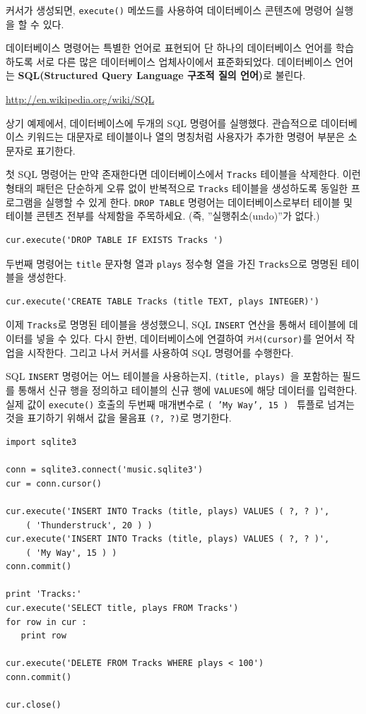 커서가 생성되면, {\tt execute()} 메쏘드를 사용하여 데이터베이스 콘텐츠에 명령어 실행을 할 수 있다.

데이터베이스 명령어는 특별한 언어로 표현되어 단 하나의 데이터베이스 언어를 학습하도록 서로 다른 많은 데이터베이스 업체사이에서 표준화되었다.
데이터베이스 언어는 {\bf SQL(Structured Query Language 구조적 질의 언어)}로 불린다.

\url{http://en.wikipedia.org/wiki/SQL}

상기 예제에서, 데이터베이스에 두개의 SQL 명령어를 실행했다. 관습적으로 데이터베이스 키워드는 대문자로 테이블이나 열의 명칭처럼 사용자가 추가한
명령어 부분은 소문자로 표기한다.

첫 SQL 명령어는 만약 존재한다면 데이터베이스에서 {\tt Tracks} 테이블을 삭제한다.
이런 형태의 패턴은 단순하게 오류 없이 반복적으로 {\tt Tracks} 테이블을 생성하도록 동일한 프로그램을 실행할 수 있게 한다.
{\tt DROP TABLE} 명령어는 데이터베이스로부터 테이블 및 테이블 콘텐츠 전부를 삭제함을 주목하세요. (즉, ''실행취소(undo)''가 없다.)

\beforeverb
\begin{verbatim}
cur.execute('DROP TABLE IF EXISTS Tracks ')
\end{verbatim}
\afterverb
%

두번째 명령어는 {\tt title} 문자형 열과 {\tt plays} 정수형 열을 가진 {\tt Tracks}으로 명명된 테이블을 생성한다.

\beforeverb
\begin{verbatim}
cur.execute('CREATE TABLE Tracks (title TEXT, plays INTEGER)')
\end{verbatim}
\afterverb
%

이제 {\tt Tracks}로 명명된 테이블을 생성했으니, SQL {\tt INSERT} 연산을 통해서 테이블에 데이터를 넣을 수 있다.
다시 한번, 데이터베이스에 연결하여 {\tt 커서(cursor)}를 얻어서 작업을 시작한다. 그리고 나서 커서를 사용하여 SQL 명령어를 수행한다.

SQL {\tt INSERT} 명령어는 어느 테이블을 사용하는지, {\tt (title, plays) }을 포함하는 필드를 통해서 신규 행을 정의하고 
테이블의 신규 행에 {\tt VALUES}에 해당 데이터를 입력한다.
실제 값이 {\tt execute()} 호출의 두번째 매개변수로 {\tt ( 'My Way', 15 ) } 튜플로 넘겨는 것을 표기하기 위해서 값을 물음표 {\tt (?, ?)}로 명기한다.

\beforeverb
\begin{verbatim}
import sqlite3

conn = sqlite3.connect('music.sqlite3')
cur = conn.cursor()

cur.execute('INSERT INTO Tracks (title, plays) VALUES ( ?, ? )', 
    ( 'Thunderstruck', 20 ) )
cur.execute('INSERT INTO Tracks (title, plays) VALUES ( ?, ? )', 
    ( 'My Way', 15 ) )
conn.commit()

print 'Tracks:'
cur.execute('SELECT title, plays FROM Tracks')
for row in cur :
   print row

cur.execute('DELETE FROM Tracks WHERE plays < 100')
conn.commit()

cur.close()
\end{verbatim}
\afterverb
%

